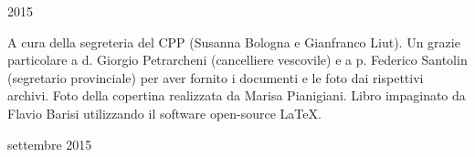 \documentclass[11pt,openright,twoside]{book}
\newcommand*\cleartoleftpage{%
  \clearpage
	\thispagestyle{empty}
  \ifodd\value{page}\hbox{}\newpage\fi
}
\begin{document}
\raggedbottom %

\begin{titlepage}
        \vspace*{10mm}
			
		\vspace{10mm}
		\vspace{\fill}
		\centering \large{2015}
\end{titlepage}








\tableofcontents
\newpage
\cleartoleftpage
\thispagestyle{empty}
\null
\vfill
\small A cura della segreteria del CPP (Susanna Bologna e Gianfranco Liut).
Un grazie particolare a d. Giorgio Petrarcheni (cancelliere vescovile) e a p. Federico Santolin (segretario provinciale) per aver fornito i documenti e le foto dai rispettivi archivi. Foto della copertina realizzata da Marisa Pianigiani. Libro impaginato da Flavio Barisi utilizzando 
il software open-source \LaTeX.
\bigbreak
\begin{center}
settembre 2015
\end{center}
\end{document}
